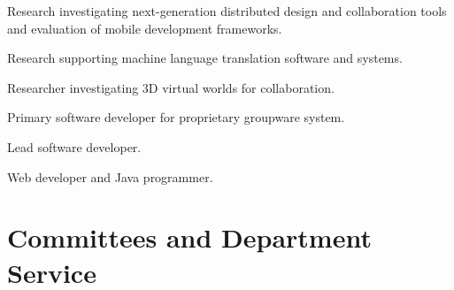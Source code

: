 \documentclass[line]{res}
\begin{document}
\begin{resume}
	\begin{position}
		Research investigating next-generation distributed design and collaboration tools and evaluation of mobile development frameworks.
	\end{position}
	
	\begin{position}
		Research supporting machine language translation software and systems. 
	\end{position}
	
	\begin{position}
		Researcher investigating 3D virtual worlds for collaboration. 
	\end{position}
	
	\begin{position}
		Primary software developer for proprietary groupware system. 
	\end{position}
	
	\begin{position}
		Lead software developer. 
	\end{position}
	
	\begin{position}
		Web developer and Java programmer. 
	\end{position}
	
	\section{\sc Committees and Department Service}
	

\end{resume}
\end{document}
